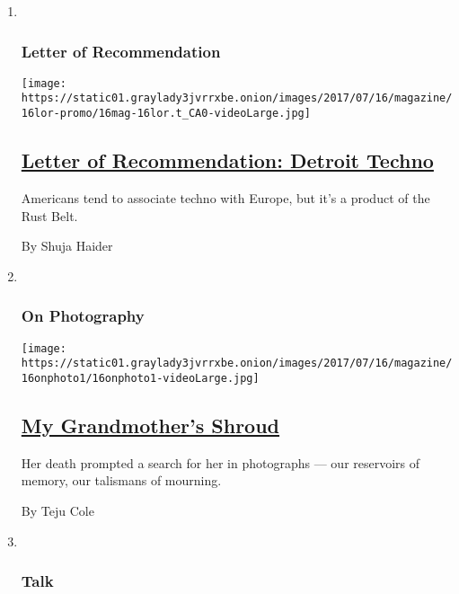 \begin{enumerate}
\def\labelenumi{\arabic{enumi}.}
\item ~
  \hypertarget{letter-of-recommendation}{%
  \subsubsection{Letter of
  Recommendation}\label{letter-of-recommendation}}

  \texttt{[image: https://static01.graylady3jvrrxbe.onion/images/2017/07/16/magazine/16lor-promo/16mag-16lor.t\_CA0-videoLarge.jpg]}

  \hypertarget{letter-of-recommendation-detroit-techno}{%
  \subsection{\texorpdfstring{\href{/2017/07/13/magazine/letter-of-recommendation-detroit-techno.html}{Letter
  of Recommendation: Detroit
  Techno}}{Letter of Recommendation: Detroit Techno}}\label{letter-of-recommendation-detroit-techno}}

  Americans tend to associate techno with Europe, but it's a product of
  the Rust Belt.

  By Shuja Haider
\item ~
  \hypertarget{on-photography}{%
  \subsubsection{On Photography}\label{on-photography}}

  \texttt{[image: https://static01.graylady3jvrrxbe.onion/images/2017/07/16/magazine/16onphoto1/16onphoto1-videoLarge.jpg]}

  \hypertarget{my-grandmothers-shroud}{%
  \subsection{\texorpdfstring{\href{/2017/07/11/magazine/my-grandmothers-shroud.html}{My
  Grandmother's
  Shroud}}{My Grandmother's Shroud}}\label{my-grandmothers-shroud}}

  Her death prompted a search for her in photographs --- our reservoirs
  of memory, our talismans of mourning.

  By Teju Cole
\item ~
  \hypertarget{talk}{%
  \subsubsection{Talk}\label{talk}}


\end{enumerate}
